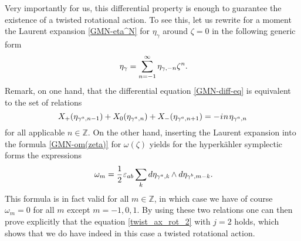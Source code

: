 \documentclass[11pt]{amsart}
\theoremstyle{remark}
\theoremstyle{remark}
\theoremstyle{definition}
\theoremstyle{definition}
\theoremstyle{definition}
\newcommand{\0}{{\scriptstyle 0'}} %
\newcommand{\1}{{\scriptstyle 1'}}
\newcommand{\pt}{\hspace{1pt}} %
\newcommand{\hp}{\hspace{0.5pt}} %
\newcommand{\nhp}{\hspace{-0.5pt}} %
\begin{document}
Very importantly for us, this differential property is enough to guarantee the existence of a twisted rotational action. To see this, let us rewrite for a moment the Laurent expansion \eqref{GMN-eta^N} for $\eta_{\gamma}$ around $\zeta = 0$ in the following generic form
\begin{equation}
\eta_{\gamma} = \sum_{n=-1}^{\infty} \eta_{\gamma,-n}\zeta^n \rlap{.}
\end{equation}
Remark, on one hand, that the differential equation \eqref{GMN-diff-eq} is equivalent to the set of relations
\begin{equation}
X_+(\eta_{\gamma^a,n-1}) + X_0(\eta_{\gamma^a,n}) + X_-(\eta_{\gamma^a,n+1}) = - \hp i \hp n \pt \eta_{\gamma^a,n}
\end{equation}
for all applicable \mbox{$n \in \mathbb{Z}$}. On the other hand, inserting the Laurent expansion into the formula \eqref{GMN-om(zeta)} for $\omega(\zeta)$ yields for the hyperk\"ahler symplectic forms the expressions
\begin{equation}
\omega_m = \frac{1}{2} \hp \varepsilon_{ab} \sum_{k} d\eta_{\gamma^{\smash a},k} \nhp \wedge d\eta_{\gamma^{\smash b}, m-k}
\rlap{.}
\end{equation}
This formula is in fact valid for all $m \in \mathbb{Z}$, in which case we have of course $\omega_m = 0$ for all $m$ except $m=-1,0,1$. By using these two relations one can then prove explicitly that the equation \eqref{twist_ax_rot_2} with $j=2$ holds, which shows that we do have indeed in this case a twisted rotational action. 
\end{document}
